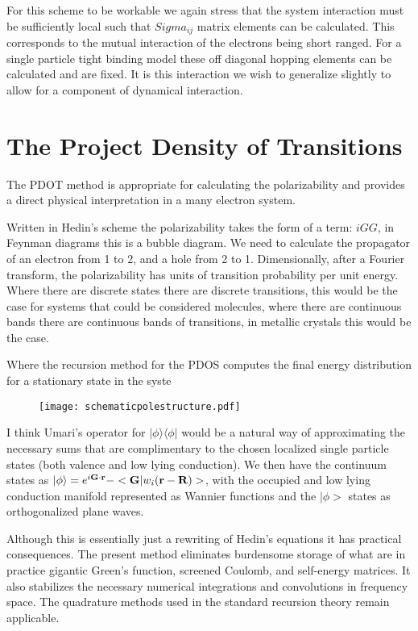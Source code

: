 \documentclass{article}
\def\ket{\rangle}
\def\bra{\langle}
\def\G{{\bf G}}
\def\r{{\bf r}}
\def\R{{\bf R}}
\begin{document}
For this scheme to be workable we again stress that the system interaction
must be sufficiently local such that $Sigma_{ij}$ matrix elements can be
calculated. This corresponds to the mutual interaction of the electrons being 
short ranged. For a single particle tight binding model these off diagonal hopping
elements can be calculated and are fixed. It is this interaction we wish
to generalize slightly to allow for a component of dynamical interaction.

\section{The Project Density of Transitions}
  The PDOT\cite{annett93, haydock00, haydock16} method is 
appropriate for calculating the polarizability and provides a direct physical
interpretation in a many electron system. 

Written in Hedin's scheme the polarizability 
takes the form of a term: $iGG$, in Feynman diagrams this is a bubble diagram. We need to calculate the propagator
of an electron from 1 to 2, and a hole from 2 to 1. Dimensionally, after a Fourier transform,
the polarizability has units of transition probability per unit energy. Where there are discrete
states there are discrete transitions, this would be the case for systems
that could be considered molecules, where there are continuous bands there are continuous
bands of transitions, in metallic crystals this would be the case.

Where the recursion method for the PDOS computes the final energy distribution
for a stationary state in the syste

\begin{figure}
\texttt{[image: schematicpolestructure.pdf]}
\end{figure}

I think Umari's operator for $|\phi\ket\bra\phi|$ would be a natural way of
approximating the necessary sums that are complimentary to the chosen
localized single particle states (both valence and low lying conduction).
We then have the continuum states as $|\phi\ket=e^{i\G\cdot\r}-<\G|w_{i}(\r-\R)>$,
with the occupied and low lying conduction manifold represented as Wannier 
functions and the $|\phi>$ states as orthogonalized plane waves.

	Although this is essentially just a rewriting of Hedin's equations
it has practical consequences. The present method eliminates
burdensome storage of what are in practice gigantic Green's function, 
screened Coulomb, and self-energy matrices. It also 
stabilizes the necessary numerical integrations and convolutions in frequency space. 
The quadrature methods used in the standard recursion theory remain applicable.
\end{document}
